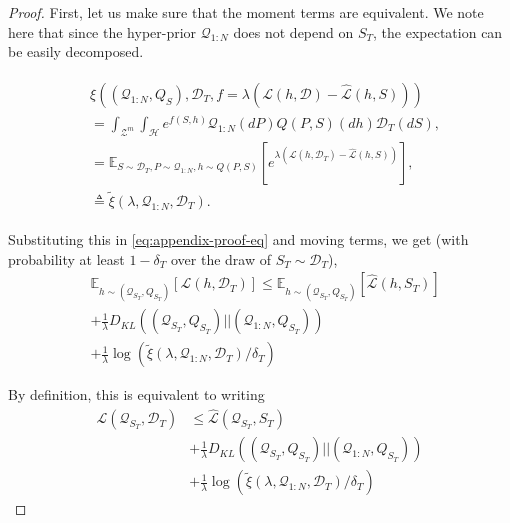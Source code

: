 \documentclass[letterpaper]{article} %
\theoremstyle{definition}
\newcommand{\Expect}[2]{\mathbb{E}_{#1}\left [#2 \right ]}
\begin{document}
\begin{proof}
	First, let us make sure that the moment terms are equivalent. We note here that since the hyper-prior $\mathcal{Q}_{1:N}$ does not depend on $S_T$, the expectation can be easily decomposed.
	
	\begin{align*}
	\begin{split}
		&\xi\left ((\mathcal{Q}_{1:N}, Q_S), \mathcal{D}_T, f=\lambda(\mathcal{L}(h,\mathcal{D})-\hat{\mathcal{L}}(h,S))\right )\\
		&=\int_{\mathcal{Z}^m}\int_{\mathcal{H}}e^{f(S,h)}\mathcal{Q}_{1:N}(dP)Q(P,S)(dh)\mathcal{D}_T(dS) ,\\
		&=\Expect{S\sim \mathcal{D}_T, P\sim \mathcal{Q}_{1:N}, h\sim Q(P,S)}{e^{\lambda\left (\mathcal{L}(h, \mathcal{D}_T)-\hat{\mathcal{L}}(h, S)\right )}} ,\\
		&\triangleq \tilde{\xi}(\lambda,\mathcal{Q}_{1:N},\mathcal{D}_T) .
	\end{split}
	\end{align*}
	
	Substituting this in \eqref{eq:appendix-proof-eq} and moving terms, we get (with probability at least $1-\delta_T$ over the draw of $S_T\sim \mathcal{D}_T$),
	\begin{equation} 
	\begin{split}
	&\Expect{h\sim (\mathcal{Q}_{S_T}, Q_{S_T})}{\mathcal{L}(h,\mathcal{D}_T)} \leq \Expect{h\sim (\mathcal{Q}_{S_T}, Q_{S_T})}{\hat{\mathcal{L}}(h,S_T)}\\
	&+\frac{1}{\lambda} D_{KL}((\mathcal{Q}_{S_T}, Q_{S_T})||(\mathcal{Q}_{1:N}, Q_{S_T}))\\
	&+\frac{1}{\lambda}\log\left (\tilde{\xi}(\lambda,\mathcal{Q}_{1:N},\mathcal{D}_T)/\delta_T\right )
	\end{split}
	\end{equation}
	
	By definition, this is equivalent to writing
%	
	\begin{equation} \label{eq:appendix-proof-eq-2}
	\begin{split}
	\mathcal{L}(\mathcal{Q}_{S_T},\mathcal{D}_T) &\leq \hat{\mathcal{L}}(\mathcal{Q}_{S_T},S_T)\\ &+\frac{1}{\lambda} D_{KL}((\mathcal{Q}_{S_T}, Q_{S_T})||(\mathcal{Q}_{1:N}, Q_{S_T})) \\
	&+\frac{1}{\lambda}\log\left (\tilde{\xi}(\lambda,\mathcal{Q}_{1:N},\mathcal{D}_T)/\delta_T\right )
	\end{split}
	\end{equation}
	

\end{proof}
\end{document}
